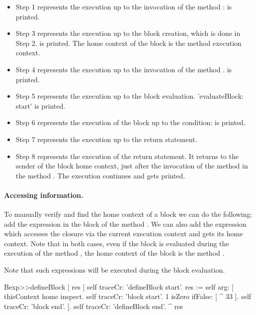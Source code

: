 \documentclass[a4paper,10pt,twoside]{book}
\begin{document}
\begin{itemize}
\item Step 1 represents the execution up to the invocation of the
  method :  is printed.

\item Step 3 represents the execution up to the block creation, which
  is done in Step 2.  is printed. The home context
  of the block is the  method execution context.

\item Step 4 represents the execution up to the invocation of the method
  .  is printed.

\item Step 5 represents the execution up to the block evaluation.
  'evaluateBlock: start' is printed.

\item Step 6 represents the execution of the block up to the
  condition:  is printed.

\item Step 7 represents the execution up to the return statement.

\item Step 8 represents the execution of the return statement. It
  returns to the sender of the block home context, \ie just after the
  invocation of the method  in the method . The
  execution continues and  gets printed.
\end{itemize}

\paragraph{Accessing information.} 

To manually verify and find the home context of a block we can do the following: add the expression  in the block of the  method . We can also add the expression  which accesses the closure via the current execution context and gets its home context. Note that in both cases, even if the block is evaluated during the execution of the method , the home context of the block is the method .

Note that such expressions will be executed during the block evaluation.

\begin{code}{}
Bexp>>defineBlock
	| res |
	self traceCr: 'defineBlock start'.
	res := self arg: [ thisContext home inspect. 
					        self traceCr: 'block start'.
                            1 isZero ifFalse: [ ^ 33 ].
                            self traceCr: 'block end'. ].
	self traceCr: 'defineBlock end'.
	^ res
\end{code}
\end{document}
